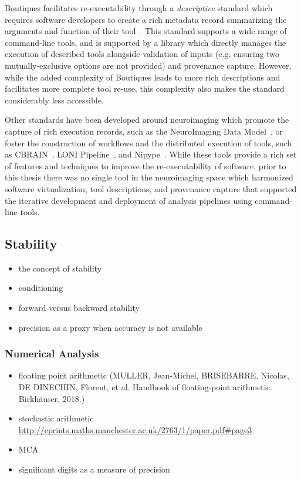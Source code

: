 Boutiques facilitates re-executability through a \textit{descriptive} standard which requires software developers to
create a rich metadata record summarizing the arguments and function of their tool~\tocite. This standard supports a
wide range of command-line tools, and is supported by a library which directly manages the execution of described tools
alongside validation of inputs (e.g. ensuring two mutually-exclusive options are not provided) and provenance capture.
However, while the added complexity of Boutiques leads to more rich descriptions and facilitates more complete tool
re-use, this complexity also makes the standard considerably less accessible.

Other standards have been developed around neuroimaging which promote the capture of rich execution records, such as
the NeuroImaging Data Model~\tocite, or foster the construction of workflows and the distributed execution of tools,
such as CBRAIN~\tocite, LONI Pipeline~\tocite, and Nipype~\tocite. While these tools provide a rich set of features
and techniques to improve the re-executability of software, prior to this thesis there was no single tool in the
neuroimaging space which harmonized software virtualization, tool descriptions, and provenance capture that supported
the iterative development and deployment of analysis pipelines using command-line tools.

\subsection{Stability}

\begin{itemize}
\item the concept of stability
\item conditioning
\item forward versus backward stability
\item precision as a proxy when accuracy is not available
\end{itemize}

\subsubsection{Numerical Analysis}
\begin{itemize}
\item floating point arithmetic (MULLER, Jean-Michel, BRISEBARRE, Nicolas, DE DINECHIN, Florent, et al. Handbook of floating-point arithmetic. Birkhäuser, 2018.)
\item stochastic arithmetic \url{http://eprints.maths.manchester.ac.uk/2763/1/paper.pdf#page3}
\item MCA
\item significant digits as a measure of precision
\end{itemize}

